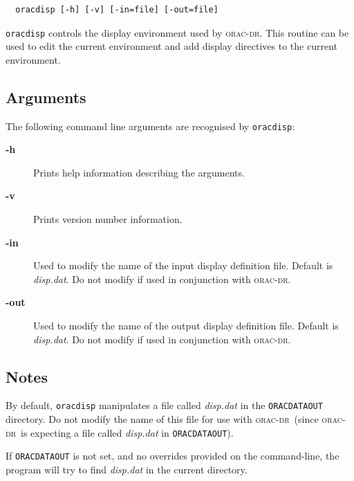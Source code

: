\documentclass[twoside,11pt]{article}
\renewcommand{\_}{\texttt{\symbol{95}}}
\newcommand{\oracdr}{\textsc{orac-dr}}
\begin{document}
\begin{verbatim}
  oracdisp [-h] [-v] [-in=file] [-out=file]
\end{verbatim}

\texttt{oracdisp} controls the display environment used by \oracdr. This
routine can be used to edit the current environment and add display directives
to the current environment.

\subsection*{Arguments\label{oracdisp_ARGUMENTS}}

The following command line arguments are recognised by \texttt{oracdisp}:

\begin{description}
\item[\textbf{-h}] \mbox{}

Prints help information describing the arguments.

\item[\textbf{-v}] \mbox{}

Prints version number information.

\item[\textbf{-in}] \mbox{}

Used to modify the name of the input display definition file.
Default is \emph{disp.dat}. Do not modify if used in conjunction with
\oracdr.

\item[\textbf{-out}] \mbox{}

Used to modify the name of the output display definition file.
Default is \emph{disp.dat}. Do not modify if used in conjunction with
\oracdr.

\end{description}
\subsection*{Notes\label{oracdisp_NOTES}}

By default, \texttt{oracdisp} manipulates a file called \emph{disp.dat}
in the \texttt{ORAC\_DATA\_OUT} directory. Do not modify the name of this
file for use with \oracdr\ (since \oracdr\ is expecting a file
called \emph{disp.dat} in \texttt{ORAC\_DATA\_OUT}).



If \texttt{ORAC\_DATA\_OUT} is not set, and no overrides provided on the
command-line, the program will try to find \emph{disp.dat} in the current
directory.
\end{document}
